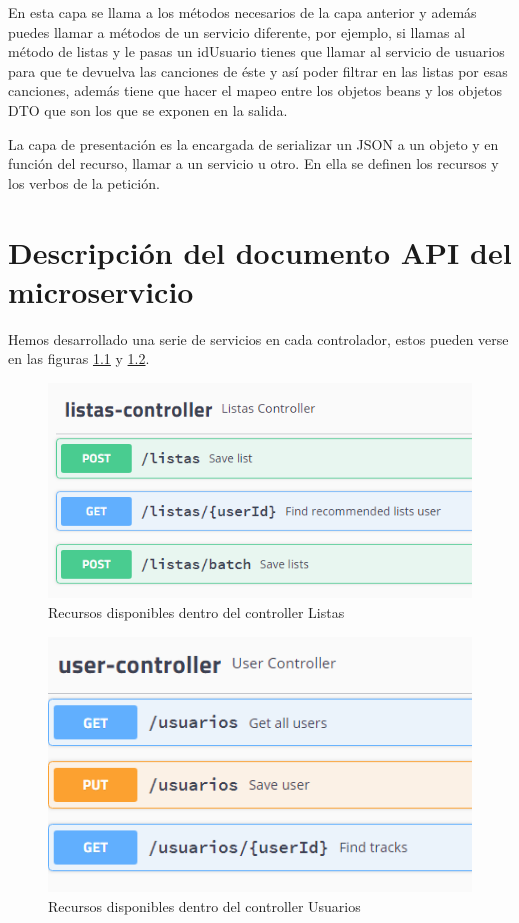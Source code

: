 \documentclass[12pt]{report} %
\begin{document}
En esta capa se llama a los métodos necesarios de la capa anterior y además puedes llamar a métodos de un servicio diferente, por ejemplo, si llamas al método de listas y le pasas un idUsuario tienes que llamar al servicio de usuarios para que te devuelva las canciones de éste y así poder filtrar en las listas por esas canciones, además tiene que hacer el mapeo entre los objetos beans y los objetos DTO que son los que se exponen en la salida.

La capa de presentación es la encargada de serializar un JSON a un objeto y en función del recurso, llamar a un servicio u otro. En ella se definen los recursos y los verbos de la petición. 

\chapter{Descripción del documento API del microservicio}

Hemos desarrollado una serie de servicios en cada controlador, estos pueden verse en las figuras \ref{fig:controllerlistas} y \ref{fig:controllerusuarios}. 

\begin{figure}
	\centering
	\includegraphics[width=0.7\linewidth]{imagenes/controllerListas}
	\caption{Recursos disponibles dentro del controller Listas}
	\label{fig:controllerlistas}
\end{figure}


\begin{figure}
	\centering
	\includegraphics[width=0.7\linewidth]{imagenes/controllerUsuarios}
	\caption{Recursos disponibles dentro del controller Usuarios}
	\label{fig:controllerusuarios}
\end{figure}
\end{document}
